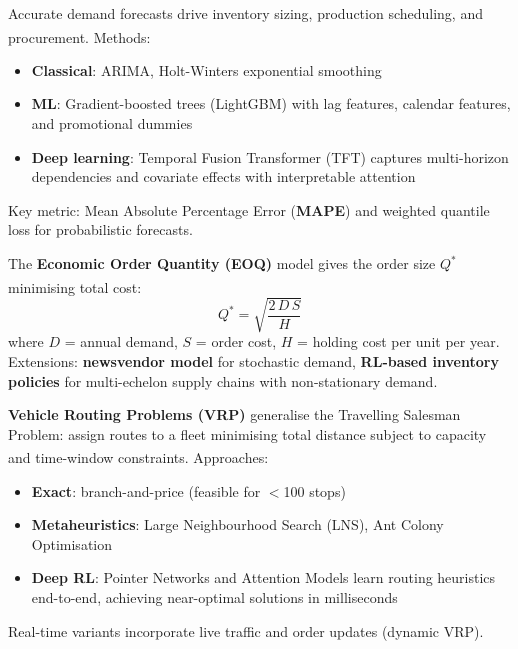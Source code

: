 \begin{tcbitemize}[ skin=sectionraster ]
    \tcbitem[title={Demand Forecasting}, raster multicolumn=3]
    Accurate demand forecasts drive inventory sizing, production scheduling, and procurement\textsuperscript{\cite[][pp.~1--5]{mahmoodInternetThingsIndustrial2019}}.
    Methods:
    \begin{itemize}
        \item \textbf{Classical}: ARIMA, Holt-Winters exponential smoothing
        \item \textbf{ML}: Gradient-boosted trees (LightGBM) with lag features, calendar features, and promotional dummies
        \item \textbf{Deep learning}: Temporal Fusion Transformer (TFT) captures multi-horizon dependencies and covariate effects with interpretable attention
    \end{itemize}
    Key metric: Mean Absolute Percentage Error (\textbf{MAPE}) and weighted quantile loss for probabilistic forecasts.

    \tcbitem[title={Inventory Optimisation}, raster multicolumn=3]
    The \textbf{Economic Order Quantity (EOQ)} model gives the order size $Q^*$ minimising total cost\textsuperscript{\cite[][pp.~8--12]{mahmoodInternetThingsIndustrial2019}}:
    \begin{equation}
        Q^* = \sqrt{\frac{2\,D\,S}{H}}
    \end{equation}
    where $D$ = annual demand, $S$ = order cost, $H$ = holding cost per unit per year.
    Extensions: \textbf{newsvendor model} for stochastic demand, \textbf{RL-based inventory policies} for multi-echelon supply chains with non-stationary demand.

    \tcbitem[title={Route Optimisation}, raster multicolumn=3]
    \textbf{Vehicle Routing Problems (VRP)} generalise the Travelling Salesman Problem: assign routes to a fleet minimising total distance subject to capacity and time-window constraints\textsuperscript{\cite[][pp.~12--18]{mahmoodInternetThingsIndustrial2019}}.
    Approaches:
    \begin{itemize}
        \item \textbf{Exact}: branch-and-price (feasible for $<$100 stops)
        \item \textbf{Metaheuristics}: Large Neighbourhood Search (LNS), Ant Colony Optimisation
        \item \textbf{Deep RL}: Pointer Networks and Attention Models learn routing heuristics end-to-end, achieving near-optimal solutions in milliseconds
    \end{itemize}
    Real-time variants incorporate live traffic and order updates (dynamic VRP).
\end{tcbitemize}

